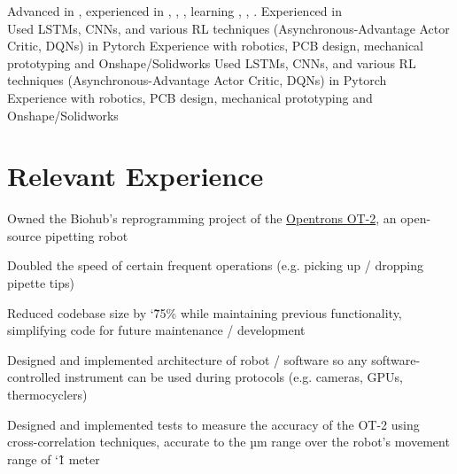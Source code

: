 \documentclass[]{deedy-resume-openfont}
\begin{document}

\begin{minipage}[t]{\textwidth}
   Advanced in , experienced in , , , learning , , . Experienced in \\
  \ifdef{\software} {
     Used LSTMs, CNNs, and various RL techniques (Asynchronous-Advantage Actor Critic, DQNs) in Pytorch
  } {
    \ifdef{\robotics} {
       Experience with robotics, PCB design, mechanical prototyping and Onshape/Solidworks
    } { 
       Used LSTMs, CNNs, and various RL techniques (Asynchronous-Advantage Actor Critic, DQNs) in Pytorch \\
       Experience with robotics, PCB design, mechanical prototyping and Onshape/Solidworks
    }
  }
\end{minipage}

\vspace{12pt}

\section{Relevant Experience}

\begin{tightemize}
    \item Owned the Biohub's reprogramming project of the \href{https://opentrons.com/ot-2/}{Opentrons OT-2}, an open-source pipetting robot
    \item Doubled the speed of certain frequent operations (e.g. picking up / dropping pipette tips)
    \item Reduced codebase size by \char`\~ 75\% while maintaining previous functionality, simplifying code for future maintenance / development
    \item Designed and implemented architecture of robot / software so any software-controlled instrument can be used during protocols (e.g. cameras, GPUs, thermocyclers)
    \item Designed and implemented tests to measure the accuracy of the OT-2 using cross-correlation techniques, accurate to the µm range over the robot's movement range of \char`\~ 1 meter
\end{tightemize}
\end{document}
